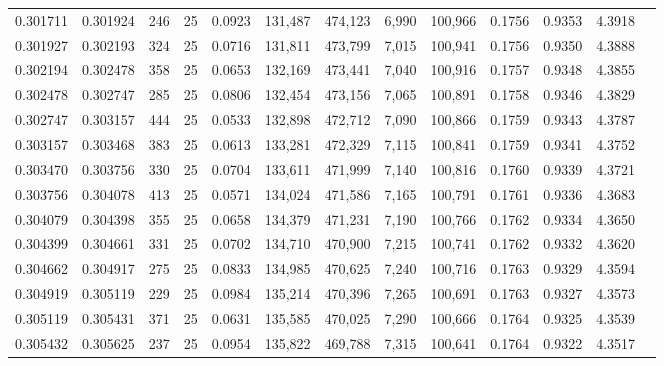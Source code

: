 \begin{tabular}{rrrrrrrrrrrrr}
0.301711 & 0.301924 &   246 &  25 &                                     0.0923 & 131,487 & 474,123 &   6,990 & 100,966 & 0.1756 & 0.9353 & 4.3918 \\
0.301927 & 0.302193 &   324 &  25 &                                     0.0716 & 131,811 & 473,799 &   7,015 & 100,941 & 0.1756 & 0.9350 & 4.3888 \\
0.302194 & 0.302478 &   358 &  25 &                                     0.0653 & 132,169 & 473,441 &   7,040 & 100,916 & 0.1757 & 0.9348 & 4.3855 \\
0.302478 & 0.302747 &   285 &  25 &                                     0.0806 & 132,454 & 473,156 &   7,065 & 100,891 & 0.1758 & 0.9346 & 4.3829 \\
0.302747 & 0.303157 &   444 &  25 &                                     0.0533 & 132,898 & 472,712 &   7,090 & 100,866 & 0.1759 & 0.9343 & 4.3787 \\
0.303157 & 0.303468 &   383 &  25 &                                     0.0613 & 133,281 & 472,329 &   7,115 & 100,841 & 0.1759 & 0.9341 & 4.3752 \\
0.303470 & 0.303756 &   330 &  25 &                                     0.0704 & 133,611 & 471,999 &   7,140 & 100,816 & 0.1760 & 0.9339 & 4.3721 \\
0.303756 & 0.304078 &   413 &  25 &                                     0.0571 & 134,024 & 471,586 &   7,165 & 100,791 & 0.1761 & 0.9336 & 4.3683 \\
0.304079 & 0.304398 &   355 &  25 &                                     0.0658 & 134,379 & 471,231 &   7,190 & 100,766 & 0.1762 & 0.9334 & 4.3650 \\
0.304399 & 0.304661 &   331 &  25 &                                     0.0702 & 134,710 & 470,900 &   7,215 & 100,741 & 0.1762 & 0.9332 & 4.3620 \\
0.304662 & 0.304917 &   275 &  25 &                                     0.0833 & 134,985 & 470,625 &   7,240 & 100,716 & 0.1763 & 0.9329 & 4.3594 \\
0.304919 & 0.305119 &   229 &  25 &                                     0.0984 & 135,214 & 470,396 &   7,265 & 100,691 & 0.1763 & 0.9327 & 4.3573 \\
0.305119 & 0.305431 &   371 &  25 &                                     0.0631 & 135,585 & 470,025 &   7,290 & 100,666 & 0.1764 & 0.9325 & 4.3539 \\
0.305432 & 0.305625 &   237 &  25 &                                     0.0954 & 135,822 & 469,788 &   7,315 & 100,641 & 0.1764 & 0.9322 & 4.3517 \\

\end{tabular}

